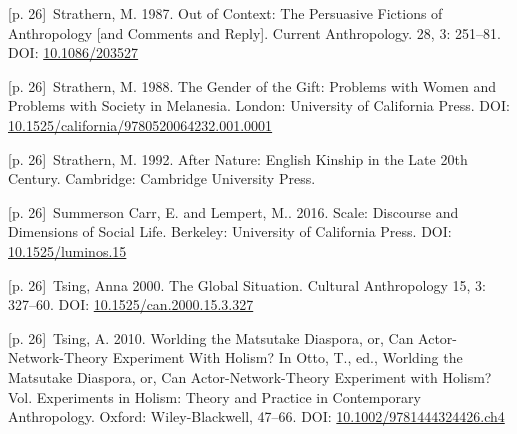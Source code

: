 \documentclass[10pt,a4paper]{article}
\begin{document}
\noindent\begin{minipage}[t]{\linewidth}{\scriptsize\color{gray} [p. 26]}\ Strathern, M. 1987. Out of Context: The Persuasive Fictions of Anthropology [and Comments and Reply]. Current Anthropology. 28, 3: 251–81. DOI: \url{10.1086/203527}\par\end{minipage}\par
\noindent\begin{minipage}[t]{\linewidth}{\scriptsize\color{gray} [p. 26]}\ Strathern, M. 1988. The Gender of the Gift: Problems with Women and Problems with Society in Melanesia. London: University of California Press. DOI: \url{10.1525/california/9780520064232.001.0001}\par\end{minipage}\par
\noindent\begin{minipage}[t]{\linewidth}{\scriptsize\color{gray} [p. 26]}\ Strathern, M. 1992. After Nature: English Kinship in the Late 20th Century. Cambridge: Cambridge University Press.\par\end{minipage}\par
\noindent\begin{minipage}[t]{\linewidth}{\scriptsize\color{gray} [p. 26]}\ Summerson Carr, E. and Lempert, M.. 2016. Scale: Discourse and Dimensions of Social Life. Berkeley: University of California Press. DOI: \url{10.1525/luminos.15}\par\end{minipage}\par
\noindent\begin{minipage}[t]{\linewidth}{\scriptsize\color{gray} [p. 26]}\ Tsing, Anna 2000. The Global Situation. Cultural Anthropology 15, 3: 327–60. DOI: \url{10.1525/can.2000.15.3.327}\par\end{minipage}\par
\noindent\begin{minipage}[t]{\linewidth}{\scriptsize\color{gray} [p. 26]}\ Tsing, A. 2010. Worlding the Matsutake Diaspora, or, Can Actor-Network-Theory Experiment With Holism? In Otto, T., ed., Worlding the Matsutake Diaspora, or, Can Actor-Network-Theory Experiment with Holism? Vol. Experiments in Holism: Theory and Practice in Contemporary Anthropology. Oxford: Wiley-Blackwell, 47–66. DOI: \url{10.1002/9781444324426.ch4}\par\end{minipage}\par
\end{document}
